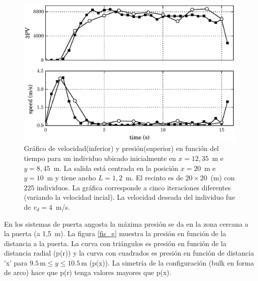 \begin{figure}[H]
    \centering
    \includegraphics[scale=0.8]{figuras/pv_vel_t_100_1_2.eps}
    \caption[width=5cm]{Gráfico de velocidad(inferior) y presión(superior) en función del tiempo para un individuo ubicado inicialmente en $x=12,35$~m e $y=8,45$~m.  La salida está centrada en la posición $x=20$~m e $y=10$~m y tiene ancho $L=1,2$~m. El recinto es de $20\times 20$~(m) con 225 individuos. La gráfica corresponde a cinco iteraciones diferentes (variando la velocidad incial). La velocidad deseada del individuo fue de $v_d=4$~m/s.}
    \label{pv_vel_t_100_1_2}
\end{figure}

En los sistemas de puerta angosta la máxima presión se da en la zona cercana a la puerta (a 1,5~m). La figura \ref{fis_g} muestra la presión en función de la distancia a la puerta. La curva con triángulos es presión en función de la distancia radial (p(r)) y la curva con cuadrados es presión en función de distancia 'x' para $9.5\,\mathrm{m}\leq y\leq 10.5\,\mathrm{m}$ (p(x)). La simetría de la configuración (bulk en forma de arco) hace que p(r) tenga valores mayores que p(x). 

